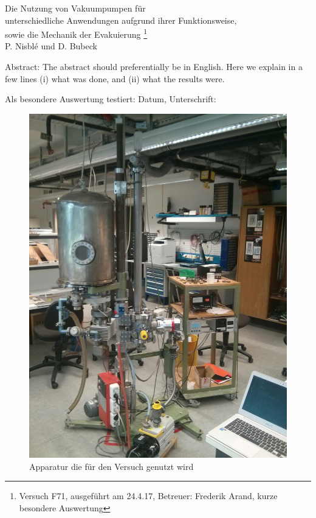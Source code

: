 \documentclass[12pt, a4paper]{scrartcl}
\begin{document}
	
	\thispagestyle{empty}
	\null\vspace{40mm}
	\begin{center}
		{
			\Large  Die Nutzung von Vakuumpumpen für\\ unterschiedliche Anwendungen aufgrund ihrer Funktionsweise,\\ 
			sowie die Mechanik der Evakuierung	
			\footnote{
				\noindent Versuch F71, ausgeführt am 24.4.17,
				Betreuer: Frederik Arand,
				kurze besondere Auswertung
			}
		}\\[15mm]
		P. Nisblé und D. Bubeck
		
		\vspace{25mm}
		
		\parbox{0.9\textwidth}{
			Abstract:    
			\small The abstract should preferentially be in English. Here we explain in a
			few lines (i) what was done, and (ii) what the results were.
		}
	\end{center}
	
	\vfill
	Als besondere Auswertung testiert: Datum, Unterschrift:
	\vspace{20mm}
	
	\newpage  
	\null\thispagestyle{empty} 
	
	\begin{figure}[H]
		\centering
		\includegraphics[height=.6\paperheight]{foto1}
		\caption{Apparatur die für den Versuch genutzt wird}
	\end{figure}
	
\end{document}
